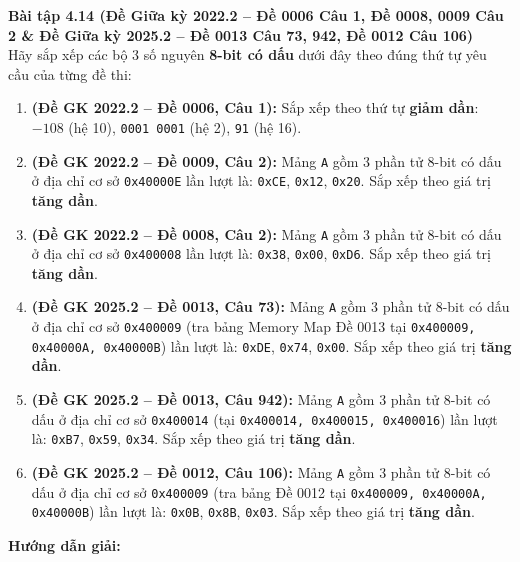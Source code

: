 \textbf{Bài tập 4.14 (Đề Giữa kỳ 2022.2 -- Đề 0006 Câu 1, Đề 0008, 0009 Câu 2 \& Đề Giữa kỳ 2025.2 -- Đề 0013 Câu 73, 942, Đề 0012 Câu 106)}\\
Hãy sắp xếp các bộ 3 số nguyên \textbf{8-bit có dấu} dưới đây theo đúng thứ tự yêu cầu của từng đề thi:
\begin{enumerate}[label=\alph*)]
    \item \textbf{(Đề GK 2022.2 -- Đề 0006, Câu 1):} Sắp xếp theo thứ tự \textbf{giảm dần}: $-108$ (hệ 10), \texttt{0001 0001} (hệ 2), \texttt{91} (hệ 16).
    \item \textbf{(Đề GK 2022.2 -- Đề 0009, Câu 2):} Mảng \texttt{A} gồm 3 phần tử 8-bit có dấu ở địa chỉ cơ sở \texttt{0x40000E} lần lượt là: \texttt{0xCE}, \texttt{0x12}, \texttt{0x20}. Sắp xếp theo giá trị \textbf{tăng dần}.
    \item \textbf{(Đề GK 2022.2 -- Đề 0008, Câu 2):} Mảng \texttt{A} gồm 3 phần tử 8-bit có dấu ở địa chỉ cơ sở \texttt{0x400008} lần lượt là: \texttt{0x38}, \texttt{0x00}, \texttt{0xD6}. Sắp xếp theo giá trị \textbf{tăng dần}.
    \item \textbf{(Đề GK 2025.2 -- Đề 0013, Câu 73):} Mảng \texttt{A} gồm 3 phần tử 8-bit có dấu ở địa chỉ cơ sở \texttt{0x400009} (tra bảng Memory Map Đề 0013 tại \texttt{0x400009, 0x40000A, 0x40000B}) lần lượt là: \texttt{0xDE}, \texttt{0x74}, \texttt{0x00}. Sắp xếp theo giá trị \textbf{tăng dần}.
    \item \textbf{(Đề GK 2025.2 -- Đề 0013, Câu 942):} Mảng \texttt{A} gồm 3 phần tử 8-bit có dấu ở địa chỉ cơ sở \texttt{0x400014} (tại \texttt{0x400014, 0x400015, 0x400016}) lần lượt là: \texttt{0xB7}, \texttt{0x59}, \texttt{0x34}. Sắp xếp theo giá trị \textbf{tăng dần}.
    \item \textbf{(Đề GK 2025.2 -- Đề 0012, Câu 106):} Mảng \texttt{A} gồm 3 phần tử 8-bit có dấu ở địa chỉ cơ sở \texttt{0x400009} (tra bảng Đề 0012 tại \texttt{0x400009, 0x40000A, 0x40000B}) lần lượt là: \texttt{0x0B}, \texttt{0x8B}, \texttt{0x03}. Sắp xếp theo giá trị \textbf{tăng dần}.
\end{enumerate}
\textbf{Hướng dẫn giải:}
